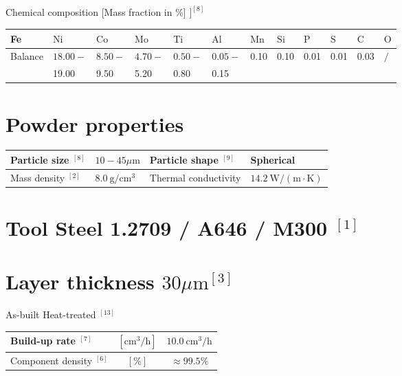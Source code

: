 \documentclass[10pt]{article}
\begin{document}
Chemical composition [Mass fraction in \%] $]^{[8]}$

\begin{center}
\begin{tabular}{|l|l|l|l|l|l|l|l|l|l|l|l|}
\hline
Fe & $\mathrm{Ni}$ & $\mathrm{Co}$ & $\mathrm{Mo}$ & $\mathrm{Ti}$ & $\mathrm{Al}$ & $\mathrm{Mn}$ & $\mathrm{Si}$ & $\mathrm{P}$ & $\mathrm{S}$ & $\mathrm{C}$ & $\mathrm{O}$ \\
\hline
Balance & $18.00-$ & $8.50-$ & $4.70-$ & $0.50-$ & $0.05-$ & 0.10 & 0.10 & 0.01 & 0.01 & 0.03 & $/$ \\
 & 19.00 & 9.50 & 5.20 & 0.80 & 0.15 &  &  &  &  &  &  \\
\hline
\end{tabular}
\end{center}

\section*{Powder properties}
\begin{center}
\begin{tabular}{|l|l|l|l|}
\hline
Particle size ${ }^{[8]}$ & $10-45 \mu \mathrm{m}$ & Particle shape ${ }^{[9]}$ & Spherical \\
\hline
Mass density ${ }^{[2]}$ & $8.0 \mathrm{~g} / \mathrm{cm}^{3}$ & Thermal conductivity & $14.2 \mathrm{~W} /(\mathrm{m} \cdot \mathrm{K})$ \\
\hline
\end{tabular}
\end{center}

\section*{Tool Steel 1.2709 / A646 / M300 ${ }^{[1]}$}
\section*{Layer thickness $30 \mu \mathrm{m}^{[3]}$}
 As-built Heat-treated ${ }^{[13]}$\begin{center}
\begin{tabular}{|l|c|c|}
\hline
Build-up rate $^{[7]}$ & $\left[\mathrm{cm}^{3} / \mathrm{h}\right]$ & $10.0 \mathrm{~cm}^{3} / \mathrm{h}$ \\
\hline
Component density $^{[6]}$ & $[\%]$ & $\approx 99.5 \%$ \\
\hline
\end{tabular}
\end{center}
\end{document}
